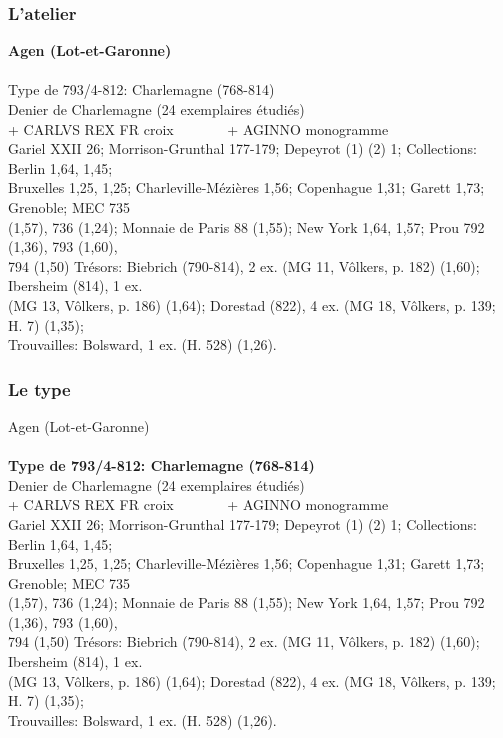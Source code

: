 \documentclass[10pt, compress]{beamer}
\begin{document}
\begin{frame}[fragile]
  \frametitle{L'atelier}
  \begin{scriptsize}
\textbf{Agen (Lot-et-Garonne)}\\~\\
\textcolor{light_gray}{
Type de 793/4-812: Charlemagne (768-814)\\
Denier de Charlemagne (24 exemplaires étudiés)\\
+ CARLVS REX FR croix~~~~~~~ + AGINNO monogramme\\
Gariel XXII 26; Morrison-Grunthal 177-179; Depeyrot (1) (2) 1; Collections: Berlin 1,64, 1,45; \\
Bruxelles 1,25, 1,25; Charleville-Mézières 1,56; Copenhague 1,31; Garett 1,73; Grenoble; MEC 735 \\
(1,57), 736 (1,24); Monnaie de Paris 88 (1,55); New York 1,64, 1,57; Prou 792 (1,36), 793 (1,60), \\
794 (1,50) Trésors: Biebrich (790-814), 2 ex. (MG 11, Vôlkers, p. 182) (1,60); Ibersheim (814), 1 ex. \\
(MG 13, Vôlkers, p. 186) (1,64); Dorestad (822), 4 ex. (MG 18, Vôlkers, p. 139; H. 7) (1,35); \\Trouvailles: Bolsward, 1 ex. (H. 528) (1,26).
} 
\end{scriptsize}
    
\end{frame}

\begin{frame}[fragile]
  \frametitle{Le type}
  \begin{scriptsize}
\textcolor{light_gray}{Agen (Lot-et-Garonne)}\\~\\

\textbf{Type de 793/4-812: Charlemagne (768-814)}\\
\textcolor{light_gray}{
Denier de Charlemagne (24 exemplaires étudiés)\\
+ CARLVS REX FR croix~~~~~~~ + AGINNO monogramme\\
Gariel XXII 26; Morrison-Grunthal 177-179; Depeyrot (1) (2) 1; Collections: Berlin 1,64, 1,45; \\
Bruxelles 1,25, 1,25; Charleville-Mézières 1,56; Copenhague 1,31; Garett 1,73; Grenoble; MEC 735 \\
(1,57), 736 (1,24); Monnaie de Paris 88 (1,55); New York 1,64, 1,57; Prou 792 (1,36), 793 (1,60), \\
794 (1,50) Trésors: Biebrich (790-814), 2 ex. (MG 11, Vôlkers, p. 182) (1,60); Ibersheim (814), 1 ex. \\
(MG 13, Vôlkers, p. 186) (1,64); Dorestad (822), 4 ex. (MG 18, Vôlkers, p. 139; H. 7) (1,35); \\Trouvailles: Bolsward, 1 ex. (H. 528) (1,26).
} 
    \end{scriptsize}
    
\end{frame}
\end{document}
